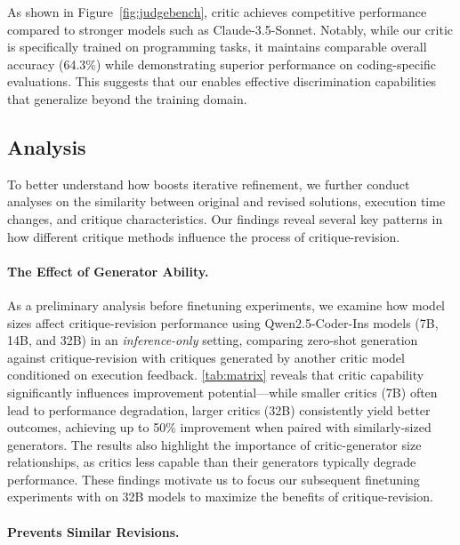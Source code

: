 As shown in Figure~\ref{fig:judgebench}, {\ours} critic achieves competitive performance compared to stronger models such as Claude-3.5-Sonnet. Notably, while our critic is specifically trained on programming tasks, it maintains comparable overall accuracy (64.3\%) while demonstrating superior performance on coding-specific evaluations. This suggests that our {\ours} enables effective discrimination capabilities that generalize beyond the training domain.




\subsection{Analysis}
To better understand how {\ours} boosts iterative refinement, we further conduct analyses on the similarity between original and revised solutions, execution time changes, and critique characteristics. Our findings reveal several key patterns in how different critique methods influence the process of critique-revision.

 

\paragraph{The Effect of Generator Ability.}
As a preliminary analysis before finetuning experiments, we examine how model sizes affect critique-revision performance using Qwen2.5-Coder-Ins models (7B, 14B, and 32B) in an \emph{inference-only} setting, comparing zero-shot generation against critique-revision with critiques generated by another critic model conditioned on execution feedback.
\cref{tab:matrix} reveals that critic capability significantly influences improvement potential—while smaller critics (7B) often lead to performance degradation, larger critics (32B) consistently yield better outcomes, achieving up to 50\% improvement when paired with similarly-sized generators. The results also highlight the importance of critic-generator size relationships, as critics less capable than their generators typically degrade performance. These findings motivate us to focus our subsequent finetuning experiments with {\ours} on 32B models to maximize the benefits of critique-revision.



\paragraph{{\ours} Prevents Similar Revisions.}

